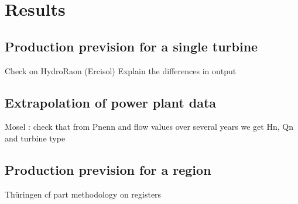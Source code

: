 \chapter{Results}
\label{chap:results}
\section{Production prevision for a single turbine}
Check on HydroRaon (Ercisol) \newline
Explain the differences in output


\section{Extrapolation of power plant data}
\label{missing_data}
Mosel : check that from Pnenn and flow values over several years we get Hn, Qn and turbine type

\section{Production prevision for a region}
Thüringen cf part methodology on registers